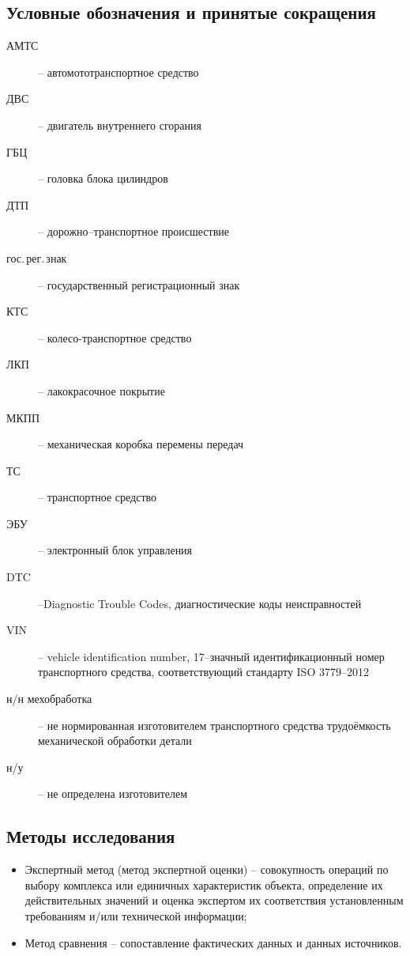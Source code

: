 \subsection{Условные обозначения и принятые сокращения}
\begin{description}
%	 
\item[АМТС] -- автомототранспортное средство
\item[ДВС] -- двигатель внутреннего сгорания
\item[ГБЦ] -- головка блока цилиндров
\item[ДТП] -- дорожно--транспортное происшествие
\item[гос.\,рег.\,знак] -- государственный регистрационный знак
\item[КТС] -- колесо-транспортное средство 
\item[ЛКП] -- лакокрасочное покрытие
\item[МКПП] -- механическая коробка перемены передач
\item[ТС] -- транспортное средство
\item[ЭБУ] -- электронный блок управления
\item[DTC] --Diagnostic Trouble Codes, диагностические коды неисправностей
\item[VIN] -- vehicle identification number, 17--значный идентификационный номер транспортного средства, соответствующий стандарту ISO 3779--2012
\item[н/н мехобработка] -- не нормированная изготовителем транспортного средства трудоёмкость механической обработки детали
\item[н/у] -- не определена изготовителем  
%
\end{description}
\subsection{Методы исследования}
\begin{itemize}
\item Экспертный метод (метод экспертной оценки) -- совокупность операций по выбору комплекса или единичных характеристик объекта, определение их действительных значений и оценка экспертом их соответствия установленным требованиям и/или технической информации;
\item Метод сравнения -- сопоставление фактических данных и данных источников.
\end{itemize}


